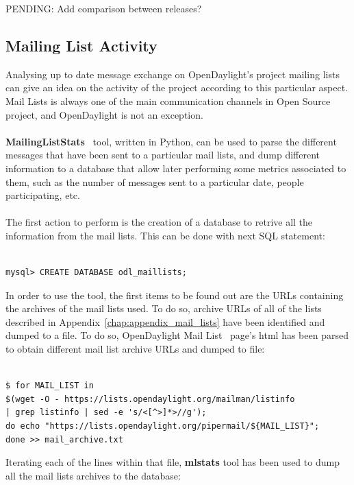 \documentclass[a4paper, 12pt]{book}
\begin{document}
PENDING: Add comparison between releases?

\subsection{Mailing List Activity}
Analysing up to date message exchange on OpenDaylight's project mailing lists can give an idea on the activity of the project according to this particular aspect. Mail Lists is always one of the main communication channels in Open Source project, and OpenDaylight is not an exception.\\
\\
{\textbf{MailingListStats}}~\cite{MailStats} tool, written in Python, can be used to parse the different messages that have been sent to a particular mail lists, and dump different information to a database that allow later performing some metrics associated to them, such as the number of messages sent to a particular date, people participating, etc.\\
\\
The first action to perform is the creation of a database to retrive all the information from the mail lists. This can be done with next SQL statement:

\begin{verbatim}

mysql> CREATE DATABASE odl_maillists;

\end{verbatim}

In order to use the tool, the first items to be found out are the URLs containing the archives of the mail lists used. To do so, archive URLs of all of the lists described in Appendix~\ref{chap:appendix_mail_lists} have been identified and dumped to a file. To do so, OpenDaylight Mail List~\cite{OpenDaylightMailLists} page's html has been parsed to obtain different mail list archive URLs and dumped to file:

\begin{verbatim}

$ for MAIL_LIST in
$(wget -O - https://lists.opendaylight.org/mailman/listinfo
| grep listinfo | sed -e 's/<[^>]*>//g');
do echo "https://lists.opendaylight.org/pipermail/${MAIL_LIST}";
done >> mail_archive.txt

\end{verbatim}

Iterating each of the lines within that file, \textbf{mlstats} tool has been used to dump all the mail lists archives to the database:
\end{document}
